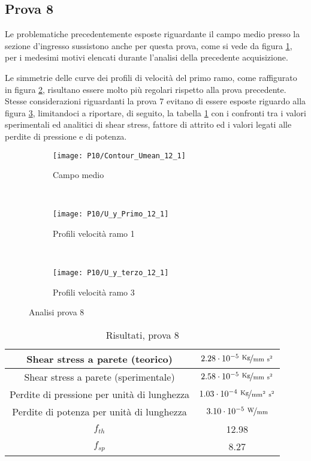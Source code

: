 \documentclass{article} %
\begin{document}
\subsection{Prova 8}
Le problematiche precedentemente esposte riguardante il campo medio presso la sezione d'ingresso sussistono anche per questa prova, come si vede da figura \ref{fig:MEAN_U_8}, per i medesimi motivi elencati durante l'analisi della precedente acquisizione.\par
Le simmetrie delle curve dei profili di velocità del primo ramo, come raffigurato in figura \ref{fig:U1_y8}, risultano essere molto più regolari rispetto alla prova precedente. Stesse considerazioni riguardanti la prova 7 evitano di essere esposte riguardo alla figura \ref{fig:U3_y8}, limitandoci a riportare, di seguito, la tabella \ref{tab:A8} con i confronti tra i valori sperimentali ed analitici di shear stress, fattore di attrito ed i valori legati alle perdite di pressione e di potenza.
\begin{figure}[h]
	\centering
	\begin{subfigure}{0.3\textwidth}
		\texttt{[image: P10/Contour\_Umean\_12\_1]}
		\caption{Campo medio}
		\label{fig:MEAN_U_8}
	\end{subfigure} ~ 
	\begin{subfigure}{0.3\textwidth}
		\texttt{[image: P10/U\_y\_Primo\_12\_1]}
		\caption{Profili velocità ramo 1}
		\label{fig:U1_y8}
	\end{subfigure} ~  
	\begin{subfigure}{0.3\textwidth}
		\texttt{[image: P10/U\_y\_terzo\_12\_1]}
		\caption{Profili velocità ramo 3}
		\label{fig:U3_y8}	
	\end{subfigure}  
	\caption{Analisi prova 8}
	\label{fig:8}
\end{figure}

\begin{table}[ht!]
	\centering
	\setlength \extrarowheight{3pt}
	\begin{tabular}{|c|c|}
		\hline
		Shear stress a parete (teorico) & $2.28 \cdot 10^{-5}\ \nicefrac{\rm Kg}{\rm mm\ s^2}$ \\ 
		\hline 
		Shear stress a parete (sperimentale) & $2.58 \cdot 10^{-5}\ \nicefrac{\rm Kg}{\rm mm\ s^2}$ \\ 
		\hline 
		Perdite di pressione per unità di lunghezza & $1.03 \cdot 10^{-4}\ \nicefrac{\rm Kg}{\rm mm^2\ s^2}$ \\ %
		\hline 
		Perdite di potenza per unità di lunghezza & $3.10 \cdot 10^{-5}\ \nicefrac{\rm W}{\rm mm}$ \\ 
		\hline 
		$f_{th}$ & 12.98 \\ 
		\hline 
		$f_{sp}$ & 8.27 \\ 
		\hline 
	\end{tabular}
	\caption{Risultati, prova 8}
	\label{tab:A8}
\end{table}
\end{document}
